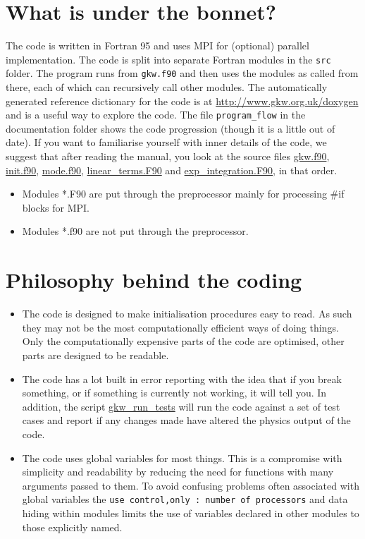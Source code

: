 \documentclass[a4paper,10pt]{article}
\newcommand{\src}[1]{\href{http://bitbucket.org/gkw/gkw/src/HEAD/src/#1}{#1}}
\newcommand{\scripts}[1]{\href{http://bitbucket.org/gkw/gkw/src/HEAD/scripts/#1}{#1}}
\begin{document}
\section{What is under the bonnet?}

The code is written in Fortran 95 and uses MPI for (optional) parallel implementation.  The code is split into separate Fortran modules in the \texttt{src} folder.  The program runs from \texttt{gkw.f90} and then uses the modules as called from there, each of which can recursively call other modules. 
The automatically generated reference dictionary for the code is at \href{http://www.gkw.org.uk/doxygen}{http://www.gkw.org.uk/doxygen} and is a useful way to explore the code.   The file \texttt{program\_flow} in the documentation folder shows the code progression (though it is a little out of date).
If you want to familiarise yourself with inner details of the code, we suggest that after reading the manual, you look at the source files 
\src{gkw.f90}, \src{init.f90}, \src{mode.f90}, \src{linear\_terms.F90} and \src{exp\_integration.F90}, in that order.

\begin{itemize}
\item Modules *.F90 are put through the preprocessor mainly for processing \#if blocks for MPI.
\item Modules *.f90 are not put through the preprocessor.
\end{itemize}

\section{Philosophy behind the coding}

\begin{itemize}
 \item The code is designed to make initialisation procedures easy to read.  As such they may not be the most computationally efficient ways of doing things. Only the computationally expensive parts of the code are optimised, other parts are designed to be readable.

 \item The code has a lot built in error reporting with the idea that if you break something, or if something is currently not working, it will tell you.  In addition, the script \scripts{gkw\_run\_tests} will run the code against a set of test cases and report if any changes made have altered the physics output of the code.

 \item The code uses global variables for most things.  This is a compromise with simplicity and readability by reducing the need for functions with many arguments passed to them. 
To avoid confusing problems often associated with global variables the \texttt{use control,only : number of processors} and data hiding within modules limits the use of variables declared in other modules to those explicitly named.

\end{itemize}
\end{document}

